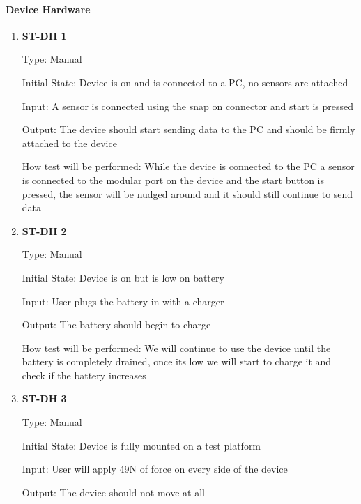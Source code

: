 \documentclass[12pt, titlepage]{article}
\begin{document}
  \paragraph{Device Hardware}	
  \begin{enumerate}
  
    \item{\bf{ST-DH 1}}
    
    Type: Manual
              
    Initial State: Device is on and is connected to a PC, no sensors are attached
              
    Input: A sensor is connected using the snap on connector and start is pressed
              
    Output: The device should start sending data to the PC and should be firmly attached to the device
              
    How test will be performed: While the device is connected to the PC a sensor is connected to the modular port on the device and the start button is pressed, the sensor will be nudged around and it should still continue to send data\\
  
    \item{\bf{ST-DH 2}}
    
    Type: Manual
              
    Initial State: Device is on but is low on battery
              
    Input: User plugs the battery in with a charger
              
    Output: The battery should begin to charge
    
              
    How test will be performed: We will continue to use the device until the battery is completely drained, once its low we will start to charge it and check if the battery increases\\

    \item{\bf{ST-DH 3}}
    
    Type: Manual
              
    Initial State: Device is fully mounted on a test platform
              
    Input: User will apply 49N of force on every side of the device
              
    Output: The device should not move at all
    

\end{enumerate}
\end{document}
